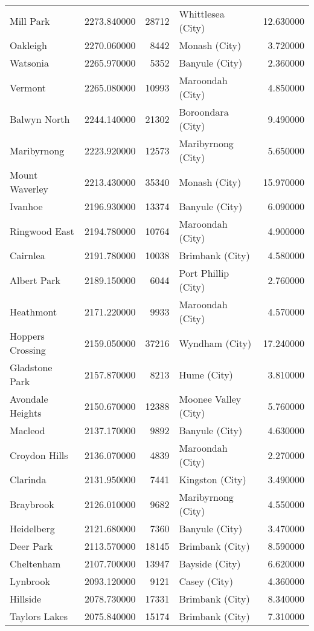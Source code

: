 \begin{table}
\begin{tabular}{lrrlr}
Mill Park & 2273.840000 & 28712 & Whittlesea (City) & 12.630000 \\
Oakleigh & 2270.060000 & 8442 & Monash (City) & 3.720000 \\
Watsonia & 2265.970000 & 5352 & Banyule (City) & 2.360000 \\
Vermont & 2265.080000 & 10993 & Maroondah (City) & 4.850000 \\
Balwyn North & 2244.140000 & 21302 & Boroondara (City) & 9.490000 \\
Maribyrnong & 2223.920000 & 12573 & Maribyrnong (City) & 5.650000 \\
Mount Waverley & 2213.430000 & 35340 & Monash (City) & 15.970000 \\
Ivanhoe & 2196.930000 & 13374 & Banyule (City) & 6.090000 \\
Ringwood East & 2194.780000 & 10764 & Maroondah (City) & 4.900000 \\
Cairnlea & 2191.780000 & 10038 & Brimbank (City) & 4.580000 \\
Albert Park & 2189.150000 & 6044 & Port Phillip (City) & 2.760000 \\
Heathmont & 2171.220000 & 9933 & Maroondah (City) & 4.570000 \\
Hoppers Crossing & 2159.050000 & 37216 & Wyndham (City) & 17.240000 \\
Gladstone Park & 2157.870000 & 8213 & Hume (City) & 3.810000 \\
Avondale Heights & 2150.670000 & 12388 & Moonee Valley (City) & 5.760000 \\
Macleod & 2137.170000 & 9892 & Banyule (City) & 4.630000 \\
Croydon Hills & 2136.070000 & 4839 & Maroondah (City) & 2.270000 \\
Clarinda & 2131.950000 & 7441 & Kingston (City) & 3.490000 \\
Braybrook & 2126.010000 & 9682 & Maribyrnong (City) & 4.550000 \\
Heidelberg & 2121.680000 & 7360 & Banyule (City) & 3.470000 \\
Deer Park & 2113.570000 & 18145 & Brimbank (City) & 8.590000 \\
Cheltenham & 2107.700000 & 13947 & Bayside (City) & 6.620000 \\
Lynbrook & 2093.120000 & 9121 & Casey (City) & 4.360000 \\
Hillside & 2078.730000 & 17331 & Brimbank (City) & 8.340000 \\
Taylors Lakes & 2075.840000 & 15174 & Brimbank (City) & 7.310000 \\

\end{tabular}
\end{table}
